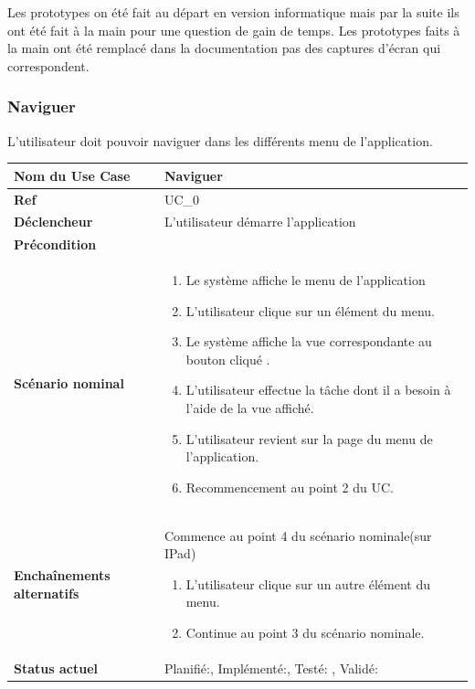 		Les prototypes on été fait au départ en version informatique mais par la suite ils ont été fait à la main pour une question de gain de temps. Les prototypes faits à la main ont été remplacé dans la documentation pas des captures d'écran qui correspondent.
		 
		\subsubsection{Naviguer}
				L'utilisateur doit pouvoir naviguer dans les différents menu de l'application.\\[0.2cm]
				\begin{longtable}{|l|p{10cm}|}
					\hline \textbf{Nom du Use Case} & Naviguer \\ 
					\hline \textbf{Ref} & UC\_0  \\ 
					\hline \textbf{Déclencheur} & L'utilisateur démarre l'application \\
					\hline \textbf{Précondition} &  \\
					\hline \textbf{Scénario nominal} & 
					\begin{enumerate}
						\item Le système affiche le menu de l'application
						\item L'utilisateur clique sur  un élément du menu.
						\item Le système affiche la vue correspondante au bouton cliqué .
						\item L'utilisateur effectue la tâche dont il a besoin à l'aide de la vue affiché.
						\item L'utilisateur revient sur la page du menu de l'application.
						\item Recommencement au point 2 du UC.
					\end{enumerate}
					\\ 
					\hline \textbf{Enchaînements alternatifs} &  
						Commence au point 4 du scénario  nominale(sur IPad)
						\begin{enumerate}
							\item L'utilisateur  clique sur un autre élément du menu.
							\item Continue au point 3 du scénario nominale.
						\end{enumerate}
						
					\\
					\hline \textbf{Status actuel} & Planifié:\CheckedBox , Implémenté:\CheckedBox , Testé: \CheckedBox , Validé: \CheckedBox \\
					\hline 
				\end{longtable} 
